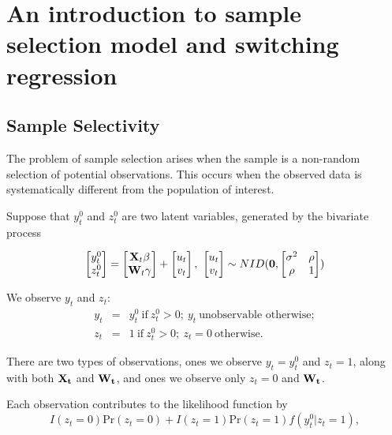 \chapter{An introduction to sample selection model and switching regression}

\section{Sample Selectivity}

The problem of sample selection arises when the sample is a
non-random selection of potential observations.  This occurs when
the observed data is systematically different from the population
of interest.

Suppose that $y_t^0$ and $z_t^0$ are two latent variables,
generated by the bivariate process

\begin{equation}
\begin{bmatrix}
y_t^0 \\ z_t^0
\end{bmatrix}
=\begin{bmatrix} {\bf X}_t \beta \\ {\bf W}_t \gamma
\end{bmatrix}+
\begin{bmatrix} u_t \\ v_t
\end{bmatrix}, \
\begin{bmatrix} u_t \\ v_t
\end{bmatrix} \sim NID({\bf 0},
\begin{bmatrix} \sigma^2 & \rho  \\ \rho  & 1
\end{bmatrix})
\end{equation}

We observe $y_t$ and $z_t$:
\begin{eqnarray}
 y_t & = & y_t^0 \ \mbox{if} \ z_t^0 > 0;  \ y_t \ \mbox{unobservable otherwise}; \nonumber \\
 z_t & = & 1  \ \mbox{if} \ z_t^0 > 0; \ z_t=0 \ \mbox{otherwise}.
\end{eqnarray}

There are two types of observations, ones we observe $y_t=y_t^0$
and $z_t=1$, along with both $\bf X_t$ and $\bf W_t$, and ones we
observe only $z_t=0$ and $\bf W_t$.

Each observation contributes to the likelihood function by
\begin{equation}
I(z_t=0)\mbox{Pr}(z_t=0)+I(z_t=1)\mbox{Pr}(z_t=1)f(y_t^0 | z_t=1),
\end{equation}

